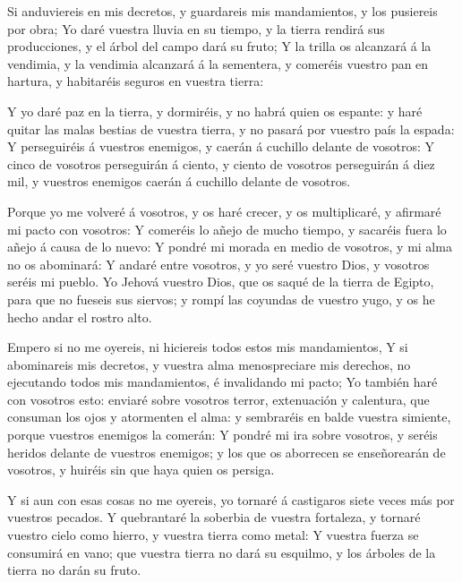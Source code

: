  Si anduviereis en mis decretos, y guardareis mis
mandamientos, y los pusiereis por obra;  Yo daré vuestra
lluvia en su tiempo, y la tierra rendirá sus producciones, y el árbol
del campo dará su fruto;  Y la trilla os alcanzará á la
vendimia, y la vendimia alcanzará á la sementera, y comeréis vuestro pan
en hartura, y habitaréis seguros en vuestra tierra:

 Y yo daré paz en la tierra, y dormiréis, y no habrá quien
os espante: y haré quitar las malas bestias de vuestra tierra, y no
pasará por vuestro país la espada:  Y perseguiréis á
vuestros enemigos, y caerán á cuchillo delante de vosotros: 
Y cinco de vosotros perseguirán á ciento, y ciento de vosotros
perseguirán á diez mil, y vuestros enemigos caerán á cuchillo delante de
vosotros.

 Porque yo me volveré á vosotros, y os haré crecer, y os
multiplicaré, y afirmaré mi pacto con vosotros:  Y comeréis
lo añejo de mucho tiempo, y sacaréis fuera lo añejo á causa de lo nuevo:
 Y pondré mi morada en medio de vosotros, y mi alma no os
abominará:  Y andaré entre vosotros, y yo seré vuestro
Dios, y vosotros seréis mi pueblo.  Yo Jehová vuestro Dios,
que os saqué de la tierra de Egipto, para que no fueseis sus siervos; y
rompí las coyundas de vuestro yugo, y os he hecho andar el rostro alto.

 Empero si no me oyereis, ni hiciereis todos estos mis
mandamientos,  Y si abominareis mis decretos, y vuestra
alma menospreciare mis derechos, no ejecutando todos mis mandamientos, é
invalidando mi pacto;  Yo también haré con vosotros esto:
enviaré sobre vosotros terror, extenuación y calentura, que consuman los
ojos y atormenten el alma: y sembraréis en balde vuestra simiente,
porque vuestros enemigos la comerán:  Y pondré mi ira sobre
vosotros, y seréis heridos delante de vuestros enemigos; y los que os
aborrecen se enseñorearán de vosotros, y huiréis sin que haya quien os
persiga.

 Y si aun con esas cosas no me oyereis, yo tornaré á
castigaros siete veces más por vuestros pecados.  Y
quebrantaré la soberbia de vuestra fortaleza, y tornaré vuestro cielo
como hierro, y vuestra tierra como metal:  Y vuestra fuerza
se consumirá en vano; que vuestra tierra no dará su esquilmo, y los
árboles de la tierra no darán su fruto.

